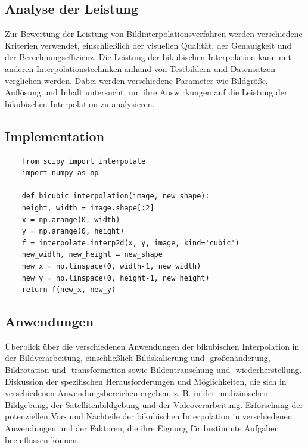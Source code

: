 \subsection{Analyse der Leistung}

    Zur Bewertung der Leistung von Bildinterpolationsverfahren werden verschiedene Kriterien verwendet, einschließlich der visuellen Qualität, der Genauigkeit und der Berechnungseffizienz. 
    Die Leistung der bikubischen Interpolation kann mit anderen Interpolationstechniken anhand von Testbildern und Datensätzen verglichen werden. 
    Dabei werden verschiedene Parameter wie Bildgröße, Auflösung und Inhalt untersucht, um ihre Auswirkungen auf die Leistung der bikubischen Interpolation zu analysieren. %



    \subsection{Implementation}
    \begin{lstlisting}
    from scipy import interpolate
    import numpy as np

    def bicubic_interpolation(image, new_shape):
    height, width = image.shape[:2]
    x = np.arange(0, width)
    y = np.arange(0, height)
    f = interpolate.interp2d(x, y, image, kind='cubic')
    new_width, new_height = new_shape
    new_x = np.linspace(0, width-1, new_width)
    new_y = np.linspace(0, height-1, new_height)
    return f(new_x, new_y)
    \end{lstlisting}


    \subsection{Anwendungen}

    Überblick über die verschiedenen Anwendungen der bikubischen Interpolation in der Bildverarbeitung, einschließlich Bildskalierung und -größenänderung, Bildrotation und -transformation sowie Bildentrauschung und -wiederherstellung.
    Diskussion der spezifischen Herausforderungen und Möglichkeiten, die sich in verschiedenen Anwendungsbereichen ergeben, z. B. in der medizinischen Bildgebung, der Satellitenbildgebung und der Videoverarbeitung.
    Erforschung der potenziellen Vor- und Nachteile der bikubischen Interpolation in verschiedenen Anwendungen und der Faktoren, die ihre Eignung für bestimmte Aufgaben beeinflussen können.

